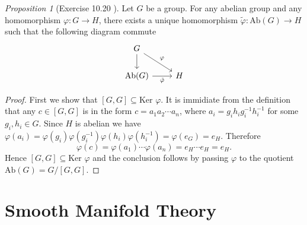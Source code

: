 \documentclass[a4paper]{article}
\theoremstyle{remark}
\newtheorem{prop}{Proposition}
\begin{document}
\begin{prop}[Exercise 10.20 \cite{LeeTM}]
Let $G$ be a group. For any abelian group and any homomorphism $\varphi : G \to H$, there exists a unique homomorphism $\tilde{\varphi} : \text{Ab}(G) \to H$ such that the following diagram commute
\[
\begin{tikzcd}
	G \arrow[d] \arrow[dr,"\varphi"] & \\
	\text{Ab}(G) \arrow[r,"\tilde{\varphi}",swap] &  H
\end{tikzcd}
\]
\end{prop}
\begin{proof}
First we show that $[G,G] \subseteq \text{Ker }\varphi$. It is immidiate from the definition that any $c \in [G,G]$ is in the form $c = a_1a_2\cdots a_n$, where $a_i = g_ih_ig_i^{-1}h_i^{-1}$ for some $g_i,h_i \in G$. Since $H$ is abelian we have $\varphi(a_i) = \varphi(g_i)\varphi(g^{-1}_i)\varphi(h_i)\varphi(h_i^{-1}) = \varphi(e_G) = e_H$. Therefore
$$
\varphi(c) = \varphi(a_1) \cdots \varphi(a_n)  = e_H \cdots e_H = e_H.
$$
Hence $[G,G] \subseteq \text{Ker }\varphi$ and the conclusion follows by passing $\varphi$ to the quotient $\text{Ab}(G) = G/[G,G]$.
\end{proof}

\section{Smooth Manifold Theory}
\end{document}
